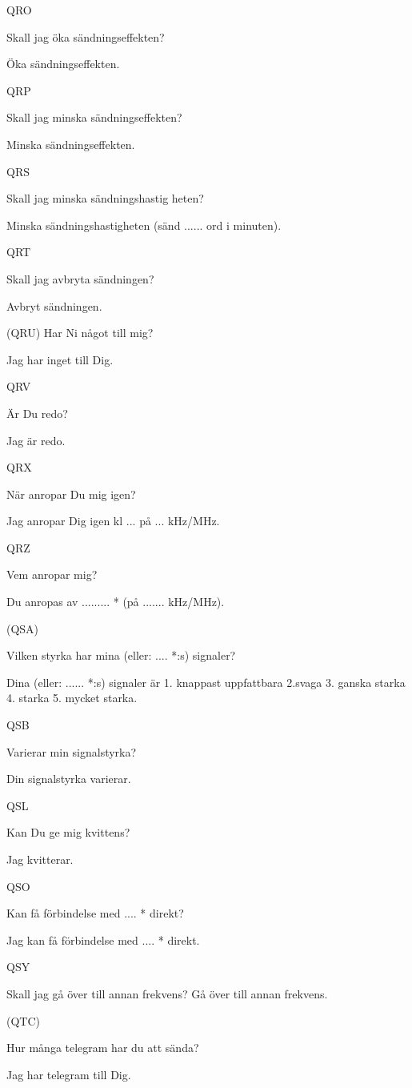 QRO

Skall jag öka sändningseffekten?

Öka sändningseffekten.

QRP

Skall jag minska sändningseffekten?

Minska sändningseffekten.

QRS

Skall jag minska sändningshastig heten?

Minska sändningshastigheten
(sänd ...... ord i minuten).

QRT

Skall jag avbryta sändningen?

Avbryt sändningen.

(QRU) Har Ni något till mig?

Jag har inget till Dig.

QRV

Är Du redo?

Jag är redo.

QRX

När anropar Du mig igen?

Jag anropar Dig igen kl ... på ... kHz/MHz.

QRZ

Vem anropar mig?

Du anropas av ......... * (på ....... kHz/MHz).

(QSA)

Vilken styrka har mina
(eller: .... *:s) signaler?

Dina (eller: ...... *:s) signaler är
1. knappast uppfattbara
2.svaga
3. ganska starka
4. starka
5. mycket starka.

QSB

Varierar min signalstyrka?

Din signalstyrka varierar.

QSL

Kan Du ge mig kvittens?

Jag kvitterar.

QSO

Kan
få förbindelse med
.... * direkt?

Jag kan få förbindelse med .... * direkt.

QSY

Skall jag gå över till annan frekvens? Gå över till annan frekvens.

(QTC)

Hur många telegram har du att
sända?

Jag har telegram till Dig.

